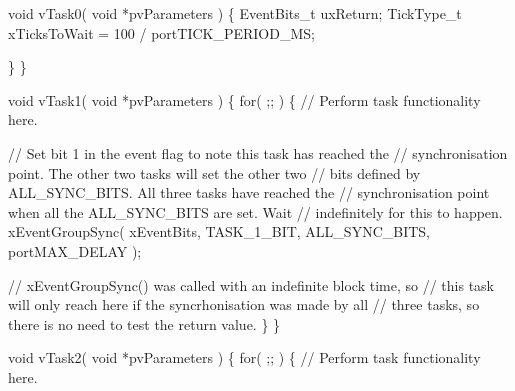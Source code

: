 \begin{DoxyPre}void vTask0( void *pvParameters )
\{
EventBits\_t uxReturn;
TickType\_t xTicksToWait = 100 / portTICK\_PERIOD\_MS;
\begin{DoxyVerb}for( ;; )
{
// Perform task functionality here.

// Set bit 0 in the event flag to note this task has reached the
// sync point.  The other two tasks will set the other two bits defined
// by ALL_SYNC_BITS.  All three tasks have reached the synchronisation
// point when all the ALL_SYNC_BITS are set.  Wait a maximum of 100ms
// for this to happen.
uxReturn = xEventGroupSync( xEventBits, TASK_0_BIT, ALL_SYNC_BITS, xTicksToWait );

if( ( uxReturn & ALL_SYNC_BITS ) == ALL_SYNC_BITS )
{
    // All three tasks reached the synchronisation point before the call
    // to xEventGroupSync() timed out.
}
\end{DoxyVerb}

   \}
\}\end{DoxyPre}



\begin{DoxyPre}void vTask1( void *pvParameters )
\{
    for( ;; )
    \{
    // Perform task functionality here.\end{DoxyPre}



\begin{DoxyPre}    // Set bit 1 in the event flag to note this task has reached the
    // synchronisation point.  The other two tasks will set the other two
    // bits defined by ALL\_SYNC\_BITS.  All three tasks have reached the
    // synchronisation point when all the ALL\_SYNC\_BITS are set.  Wait
    // indefinitely for this to happen.
    xEventGroupSync( xEventBits, TASK\_1\_BIT, ALL\_SYNC\_BITS, portMAX\_DELAY );\end{DoxyPre}



\begin{DoxyPre}    // xEventGroupSync() was called with an indefinite block time, so
    // this task will only reach here if the syncrhonisation was made by all
    // three tasks, so there is no need to test the return value.
    \}
\}\end{DoxyPre}



\begin{DoxyPre}void vTask2( void *pvParameters )
\{
    for( ;; )
    \{
    // Perform task functionality here.\end{DoxyPre}



